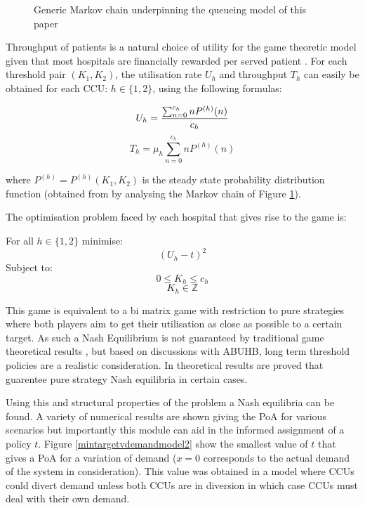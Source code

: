 \documentclass[a4paper,11pt]{article}
\begin{document}
\begin{figure}[!htbp]
\begin{center}

\caption{Generic Markov chain underpinning the queueing model of this paper} \label{mc}
\end{center}
\end{figure}

Throughput of patients is a natural choice of utility for the game theoretic model given that most hospitals are financially rewarded per served patient \cite{Pate2009}.
For each threshold pair $(K_{1},K_{2})$, the utilisation rate $U_h$ and throughput $T_h$ can easily be obtained for each CCU: $h\in\{\text{1},\text{2}\}$, using the following formulas:

$$U_{h}={{\sum_{n=0}^{c_h} nP^{(h)}(n)}\over{c_{h}}}$$
$$T_{h}=\mu_h \sum _{n=0}^{c_h} nP^{(h)}(n)$$

where $P^{(h)}=P^{(h)}(K_{1},K_{2})$ is the steady state probability distribution function (obtained from by analysing the Markov chain of Figure \ref{mc}).

The optimisation problem faced by each hospital that gives rise to the game is:

For all $h\in\{\text{1}, \text{2}\}$ minimise:
\begin{equation}\left(U_{h}-t\right)^2\end{equation}
Subject to:
\begin{equation}
0\leq K_h \leq c_{h}
\end{equation}
\begin{equation}
K_h \in  \mathbb{Z}
\end{equation}

This game is equivalent to a bi matrix game with restriction to pure strategies where both players aim to get their utilisation as close as possible to a certain target.
As such a Nash Equilibrium is not guaranteed by traditional game theoretical results \cite{Nash1950}, but based on discussions with ABUHB, long term threshold policies are a realistic consideration.
In \cite{knight2014} theoretical results are proved that guarentee pure strategy Nash equilibria in certain cases.

Using this and structural properties of the problem a Nash equilibria can be found.
A variety of numerical results are shown giving the PoA for various scenarios but importantly this module can aid in the informed assignment of a policy $t$.
Figure \ref{mintargetvdemandmodel2} show the smallest value of $t$ that gives a PoA for a variation of demand ($x=0$ corresponds to the actual demand of the system in consideration).
This value was obtained in a model where CCUs could divert demand unless both CCUs are in diversion in which case CCUs must deal with their own demand.
\end{document}
